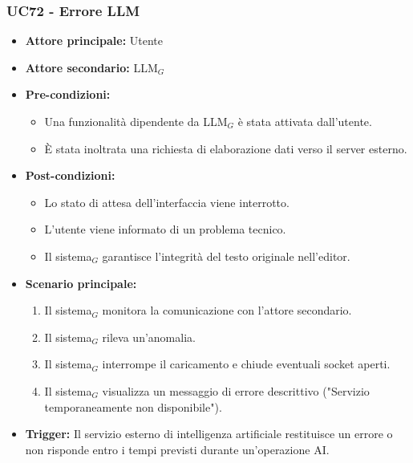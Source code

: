 \documentclass[a4paper, 10pt]{article}
\begin{document}
\subsubsection{UC72 - Errore LLM}
\hypertarget{uc:72}{}
\begin{itemize}
    \item \textbf{Attore principale:} Utente
    \item \textbf{Attore secondario:} LLM$_G$
    \item \textbf{Pre-condizioni:} 
        \begin{itemize}
            \item Una funzionalità dipendente da LLM$_G$ è stata attivata dall'utente.
            \item È stata inoltrata una richiesta di elaborazione dati verso il server esterno.
        \end{itemize}
    \item \textbf{Post-condizioni:} 
        \begin{itemize}
            \item Lo stato di attesa dell'interfaccia viene interrotto.
            \item L'utente viene informato di un problema tecnico.
            \item Il sistema$_G$ garantisce l'integrità del testo originale nell'editor.
        \end{itemize}
    \item \textbf{Scenario principale:}
        \begin{enumerate}
            \item Il sistema$_G$ monitora la comunicazione con l'attore secondario.
            \item Il sistema$_G$ rileva un'anomalia.
            \item Il sistema$_G$ interrompe il caricamento e chiude eventuali socket aperti.
            \item Il sistema$_G$ visualizza un messaggio di errore descrittivo ("Servizio temporaneamente non disponibile").
        \end{enumerate}
    \item \textbf{Trigger:} Il servizio esterno di intelligenza artificiale restituisce un errore o non risponde entro i tempi previsti durante un'operazione AI.
\end{itemize}
\end{document}
